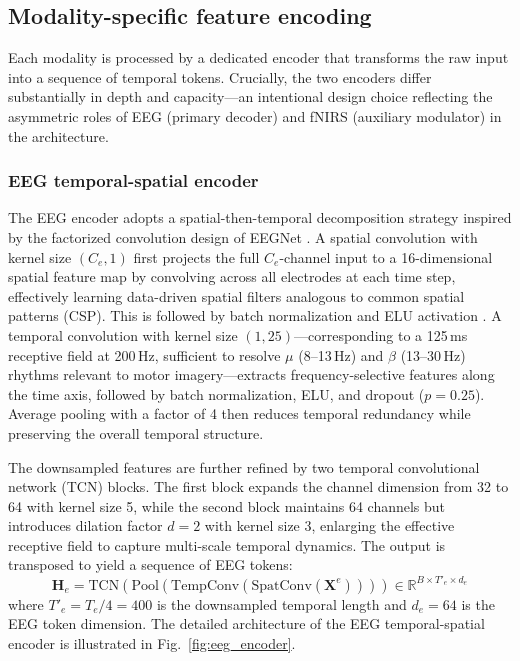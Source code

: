 \documentclass[preprint,12pt,authoryear]{elsarticle}
\begin{document}
\subsection{Modality-specific feature encoding}
\label{sec:encoding}

Each modality is processed by a dedicated encoder that transforms the raw input into a sequence of temporal tokens. Crucially, the two encoders differ substantially in depth and capacity---an intentional design choice reflecting the asymmetric roles of EEG (primary decoder) and fNIRS (auxiliary modulator) in the architecture.

\subsubsection{EEG temporal-spatial encoder}
\label{sec:eeg_encoder}

The EEG encoder adopts a spatial-then-temporal decomposition strategy inspired by the factorized convolution design of EEGNet \citep{lawhern2018eegnet}. A spatial convolution with kernel size $(C_e, 1)$ first projects the full $C_e$-channel input to a 16-dimensional spatial feature map by convolving across all electrodes at each time step, effectively learning data-driven spatial filters analogous to common spatial patterns (CSP). This is followed by batch normalization \citep{ioffe2015batchnorm} and ELU activation \citep{clevert2015elu}. A temporal convolution with kernel size $(1, 25)$---corresponding to a 125\,ms receptive field at 200\,Hz, sufficient to resolve $\mu$ (8--13\,Hz) and $\beta$ (13--30\,Hz) rhythms relevant to motor imagery---extracts frequency-selective features along the time axis, followed by batch normalization, ELU, and dropout \citep{srivastava2014dropout} ($p = 0.25$). Average pooling with a factor of 4 then reduces temporal redundancy while preserving the overall temporal structure.

The downsampled features are further refined by two temporal convolutional network (TCN) blocks. The first block expands the channel dimension from 32 to 64 with kernel size 5, while the second block maintains 64 channels but introduces dilation factor $d = 2$ with kernel size 3, enlarging the effective receptive field to capture multi-scale temporal dynamics. The output is transposed to yield a sequence of EEG tokens:
\begin{equation}
\label{eq:eeg_tokens}
\mathbf{H}_e = \mathrm{TCN}\!\left(\mathrm{Pool}\!\left(\mathrm{TempConv}\!\left(\mathrm{SpatConv}(\mathbf{X}^{e})\right)\right)\right) \in \mathbb{R}^{B \times T'_e \times d_e}
\end{equation}
where $T'_e = T_e / 4 = 400$ is the downsampled temporal length and $d_e = 64$ is the EEG token dimension. The detailed architecture of the EEG temporal-spatial encoder is illustrated in Fig.~\ref{fig:eeg_encoder}.
\end{document}
